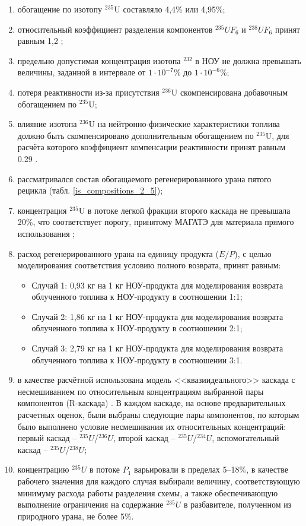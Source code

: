 \begin{enumerate}
    \item обогащение по изотопу $^{235}$U составляло 4,4\% или 4,95\%;
    \item относительный коэффициент разделения компонентов $^{235}UF_6$ и $^{238}UF_6$ принят равным 1,2 \cite{smirnovEvolutionIsotopicComposition2012};
    \item предельно допустимая концентрация изотопа $^{232}$ в НОУ не должна превышать величины, заданной в интервале от $1\cdot10^{-7}$\% до $1\cdot10^{-6}$\%;
    \item потеря реактивности из-за присутствия $^{236}$U скомпенсирована добавочным обогащением по $^{235}$U;
    \item влияние изотопа $^{236}$U на нейтронно-физические характеристики топлива должно быть скомпенсировано дополнительным обогащением по $^{235}$U, для расчёта которого коэффициент компенсации реактивности принят равным 0.29 \cite{smirnovApplyingEnrichmentCapacities2018}.
    \item рассматривался состав обогащаемого регенерированного урана пятого рецикла (табл. \ref{is_compositions_2_5});
    \item концентрация $^{235}$U в потоке легкой фракции второго каскада не превышала 20\%, что соответствует порогу, принятому МАГАТЭ для материала прямого использования \cite{alekseevConceptUseRecycled2010};
    \item расход регенерированного урана на единицу продукта ($E/P$), с целью моделирования соответствия условию полного возврата, принят равным:
    \begin{itemize}
        \item Случай 1: 0,93 кг на 1 кг НОУ-продукта для моделирования возврата облученного топлива к НОУ-продукту в соотношении 1:1;
        \item Случай 2: 1,86 кг на 1 кг НОУ-продукта для моделирования возврата облученного топлива к НОУ-продукту в соотношении 2:1;
        \item Случай 3: 2,79 кг на 1 кг НОУ-продукта для моделирования возврата облученного топлива к НОУ-продукту в соотношении 3:1.
    \end{itemize}
    \item в качестве расчётной использована модель <<квазиидеального>> каскада \cite{sazykinKvaziidealnyeKaskadyDlya2000} с несмешиванием по относительным концентрациям выбранной пары компонентов (R-каскада) \cite{sulaberidzeTeoriyaKaskadovDlya2011}. В каждом каскаде, на основе предварительных расчетных оценок, были выбраны следующие пары компонентов, по которым было выполнено условие несмешивания их относительных концентраций: первый каскад -- $^{235}U$/$^{236}U$, второй каскад -- $^{235}U$/$^{234}U$, вспомогательный каскад -- $^{235}U$/$^{238}U$;
    \item концентрацию $^{235}U$ в потоке $P_1$ варьировали в пределах 5--18\%, в качестве рабочего значения для каждого случая выбирали величину, соответствующую минимуму расхода работы разделения схемы, а также обеспечивающую выполнение ограничения на содержание $^{235}U$ в разбавителе, полученном из природного урана, не более 5\%.
\end{enumerate}

